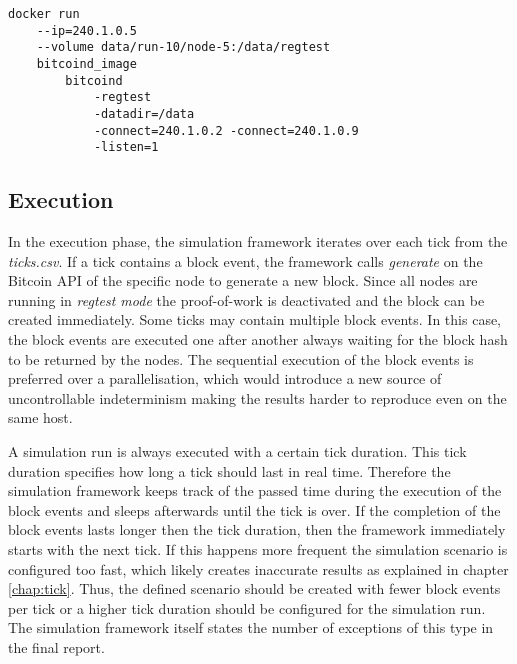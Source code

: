 \begin{minipage}{\linewidth}
\begin{lstlisting}[caption=Simplified version of how a node is started with \textit{Docker} and \textit{bitcoind}, label={lst:docker_create}, basicstyle=\ttfamily, captionpos=b]
docker run
	--ip=240.1.0.5
	--volume data/run-10/node-5:/data/regtest
	bitcoind_image
		bitcoind
			-regtest
			-datadir=/data
			-connect=240.1.0.2 -connect=240.1.0.9
			-listen=1
\end{lstlisting}
\end{minipage}
	
\subsection{Execution}
\label{chap:simulation_execution}

In the execution phase, the simulation framework iterates over each tick from the \textit{ticks.csv}.
If a tick contains a block event, the framework calls \textit{generate} on the Bitcoin API of the specific node to generate a new block.
Since all nodes are running in \textit{regtest mode} the proof-of-work is deactivated and the block can be created immediately.
Some ticks may contain multiple block events.
In this case, the block events are executed one after another always waiting for the block hash to be returned by the nodes.
The sequential execution of the block events is preferred over a parallelisation, which would introduce a new source of uncontrollable indeterminism making the results harder to reproduce even on the same host.

A simulation run is always executed with a certain tick duration.
This tick duration specifies how long a tick should last in real time.
Therefore the simulation framework keeps track of the passed time during the execution of the block events and sleeps afterwards until the tick is over.
If the completion of the block events lasts longer then the tick duration, then the framework immediately starts with the next tick. %
If this happens more frequent the simulation scenario is configured too fast, which likely creates inaccurate results as explained in chapter \ref{chap:tick}.
Thus, the defined scenario should be created with fewer block events per tick or a higher tick duration should be configured for the simulation run.
The simulation framework itself states the number of exceptions of this type in the final report.

